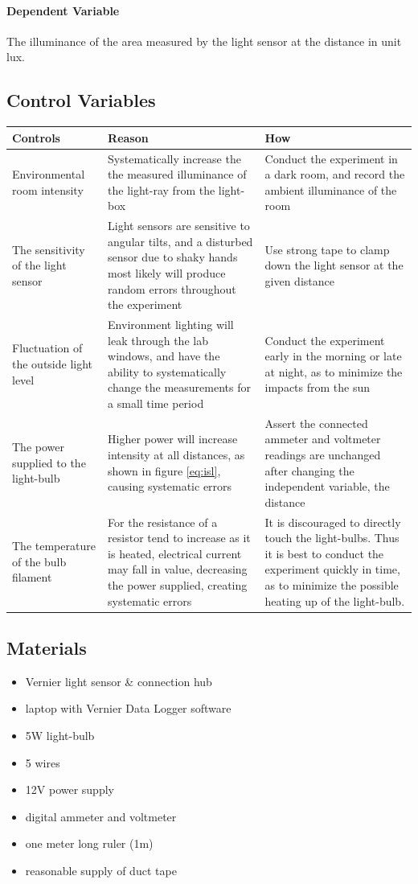 \documentclass[a4paper,12pt]{article}
\begin{document}
\paragraph{Dependent Variable}
The illuminance of the area measured by the light sensor at the distance in unit lux.

\subsection{Control Variables}

\begin{longtable}{P{0.2\textwidth}|P{0.35\textwidth}|P{0.35\textwidth}}
Controls & Reason & How\\\hline
Environmental room intensity & Systematically increase the the measured illuminance of the light-ray from the light-box & Conduct the experiment in a dark room, and record the ambient illuminance of the room \\
The sensitivity of the light sensor & Light sensors are sensitive to angular tilts, and a disturbed sensor due to shaky hands most likely will produce random errors throughout the experiment & Use strong tape to clamp down the light sensor at the given distance\\
Fluctuation of the outside light level & Environment lighting will leak through the lab windows, and have the ability to systematically change the measurements for a small time period & Conduct the experiment early in the morning or late at night, as to minimize the impacts from the sun\\
The power supplied to the light-bulb & Higher power will increase intensity at all distances, as shown in figure \ref{eq:isl}, causing systematic errors & Assert the connected ammeter and voltmeter readings are unchanged after changing the independent variable, the distance\\
The temperature of the bulb filament & For the resistance of a resistor tend to increase as it is heated, electrical current may fall in value, decreasing the power supplied, creating systematic errors & It is discouraged to directly touch the light-bulbs. Thus it is best to conduct the experiment quickly in time, as to minimize the possible heating up of the light-bulb.

\end{longtable}


\subsection{Materials}
\begin{itemize}
 \item Vernier light sensor \& connection hub
 \item laptop with Vernier Data Logger software
 \item 5W light-bulb
 \item 5 wires
 \item 12V power supply
 \item digital ammeter and voltmeter
 \item one meter long ruler (1m)
 \item reasonable supply of duct tape
 \end{itemize}
\end{document}
